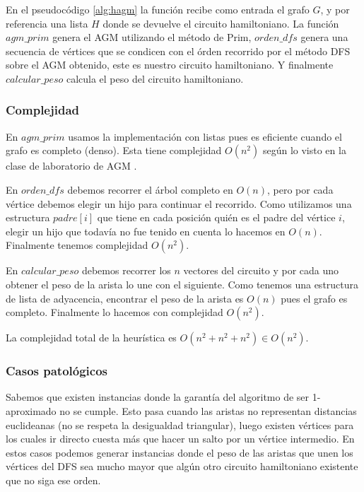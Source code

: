 \documentclass[10pt,a4paper]{article}
\begin{document}
En el pseudocódigo \ref{alg:hagm} la función recibe como entrada el grafo $G$, y por referencia una lista $H$ donde se devuelve el circuito hamiltoniano. La función $agm\_prim$ genera el AGM utilizando el método de Prim, $orden\_dfs$ genera una secuencia de vértices que se condicen con el órden recorrido por el método DFS sobre el AGM obtenido, este es nuestro circuito hamiltoniano. Y finalmente $calcular\_peso$ calcula el peso del circuito hamiltoniano.

\subsubsection{Complejidad}
En $agm\_prim$ usamos la implementación con listas pues es eficiente cuando el grafo es completo (denso). Esta tiene complejidad $O(n^2)$ según lo visto en la clase de laboratorio de AGM \cite{lab:AGM}.

En $orden\_dfs$ debemos recorrer el árbol completo en $O(n)$, pero por cada vértice debemos elegir un hijo para continuar el recorrido. Como utilizamos una estructura $padre[i]$ que tiene en cada posición quién es el padre del vértice $i$, elegir un hijo que todavía no fue tenido en cuenta lo hacemos en $O(n)$. Finalmente tenemos complejidad $O(n^2)$.

En $calcular\_peso$ debemos recorrer los $n$ vectores del circuito y por cada uno obtener el peso de la arista lo une con el siguiente. Como tenemos una estructura de lista de adyacencia, encontrar el peso de la arista es $O(n)$ pues el grafo es completo. Finalmente lo hacemos con complejidad $O(n^2)$.

La complejidad total de la heurística es $O(n^2 + n^2 + n^2) \in O(n^2)$.

\subsubsection{Casos patológicos}
Sabemos que existen instancias donde la garantía del algoritmo de ser 1-aproximado no se cumple. Esto pasa cuando las aristas no representan distancias euclideanas (no se respeta la desigualdad triangular), luego existen vértices para los cuales ir directo cuesta más que hacer un salto por un vértice intermedio. En estos casos podemos generar instancias donde el peso de las aristas que unen los vértices del DFS sea mucho mayor que algún otro circuito hamiltoniano existente que no siga ese orden.
\end{document}
